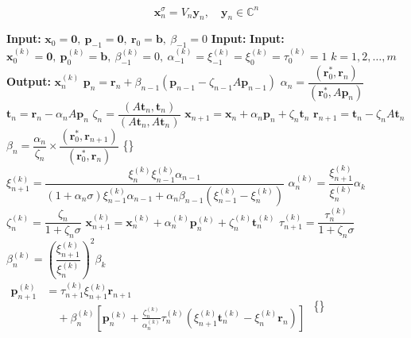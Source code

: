 \[\bm x_n^{\sigma}=V_n\bm y_n,\quad\bm y_n\in\mathbb C^n\]
\begin{algorithm}[H]\caption{}\label{alg:shifted-bicgstab}\begin{algorithmic}[1]
\Statex\textbf{Input:} $\bm x_0=\bm0,\ \bm p_{-1}=\bm0,\ \bm r_0=\bm b,\ \beta_{-1}=0$
\Statex\textbf{Input:} 
\Statex\textbf{Input:} $\bm x_0^{(k)}=\bm0,\ \bm p_0^{(k)}=\bm b,\ \beta_{-1}^{(k)}=0,\ \alpha_{-1}^{(k)}=\xi_{-1}^{(k)}=\xi_0^{(k)}=\tau_0^{(k)}=1$  $k=1,2,\ldots,m$
\Statex\textbf{Output:} $\bm x_n^{(k)}$
\State $\bm p_n=\bm r_n+\beta_{n-1}(\bm p_{n-1}-\zeta_{n-1}A\bm p_{n-1})$
\State $\alpha_n=\dfrac{(\bm r_0^*,\bm r_n)}{(\bm r_0^*,A\bm p_n)}$
\State $\bm t_n=\bm r_n-\alpha_nA\bm p_n$
\State $\zeta_n=\dfrac{(A\bm t_n,\bm t_n)}{(A\bm t_n,A\bm t_n)}$
\State $\bm x_{n+1}=\bm x_n+\alpha_n\bm p_n+\zeta_n\bm t_n$
\State $\bm r_{n+1}=\bm t_n-\zeta_nA\bm t_n$
\State $\beta_n=\dfrac{\alpha_n}{\zeta_n}\times\dfrac{(\bm r_0^*,\bm r_{n+1})}{(\bm r_0^*,\bm r_n)}$
\State \{\}
\State $\xi_{n+1}^{(k)}=\dfrac{\xi_n^{(k)}\xi_{n-1}^{(k)}\alpha_{n-1}}{(1+\alpha_n\sigma)\xi_{n-1}^{(k)}\alpha_{n-1}+\alpha_n\beta_{n-1}(\xi_{n-1}^{(k)}-\xi_n^{(k)})}$
\State $\alpha_n^{(k)}=\dfrac{\xi_{n+1}^{(k)}}{\xi_n^{(k)}}\alpha_k$
\State $\zeta_n^{(k)}=\dfrac{\zeta_n}{1+\zeta_n\sigma}$
\State $\bm x_{n+1}^{(k)}=\bm x_n^{(k)}+\alpha_n^{(k)}\bm p_n^{(k)}+\zeta_n^{(k)}\bm t_n^{(k)}$
\State $\tau_{n+1}^{(k)}=\dfrac{\tau_n^{(k)}}{1+\zeta_n\sigma}$
\State $\beta_n^{(k)}=\left(\dfrac{\xi_{n+1}^{(k)}}{\xi_n^{(k)}}\right)^2\beta_k$
\State $\begin{aligned}\bm p_{n+1}^{(k)}&=\tau_{n+1}^{(k)}\xi_{n+1}^{(k)}\bm r_{n+1}\\&\quad+\beta_n^{(k)}\left[\bm p_n^{(k)}+\frac{\zeta_n^{(k)}}{\alpha_n^{(k)}}\tau_n^{(k)}(\xi_{n+1}^{(k)}\bm t_n^{(k)}-\xi_n^{(k)}\bm r_n)\right]\end{aligned}$
\EndFor
\State \{\}
\EndFor\end{algorithmic}\end{algorithm}
